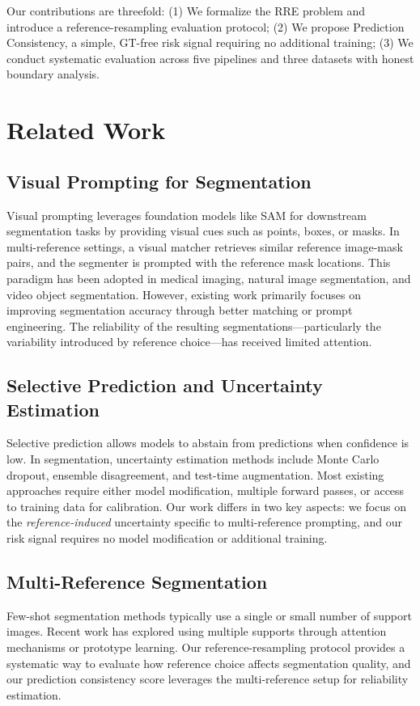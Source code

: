 \documentclass[11pt]{article}
\newcommand{\RRE}{RRE}
\begin{document}
Our contributions are threefold: (1) We formalize the \RRE{} problem and introduce a 
reference-resampling evaluation protocol; (2) We propose Prediction Consistency, a simple, 
GT-free risk signal requiring no additional training; (3) We conduct systematic evaluation 
across five pipelines and three datasets with honest boundary analysis.

\section{Related Work}

\subsection{Visual Prompting for Segmentation}
Visual prompting leverages foundation models like SAM for downstream segmentation tasks 
by providing visual cues such as points, boxes, or masks. In multi-reference settings, 
a visual matcher retrieves similar reference image-mask pairs, and the segmenter is 
prompted with the reference mask locations. This paradigm has been adopted in medical 
imaging, natural image segmentation, and video object segmentation. However, existing 
work primarily focuses on improving segmentation accuracy through better matching or 
prompt engineering. The reliability of the resulting segmentations---particularly the 
variability introduced by reference choice---has received limited attention.

\subsection{Selective Prediction and Uncertainty Estimation}
Selective prediction allows models to abstain from predictions when confidence is low. 
In segmentation, uncertainty estimation methods include Monte Carlo dropout, ensemble 
disagreement, and test-time augmentation. Most existing approaches require either model 
modification, multiple forward passes, or access to training data for calibration. Our 
work differs in two key aspects: we focus on the \textit{reference-induced} uncertainty 
specific to multi-reference prompting, and our risk signal requires no model modification 
or additional training.

\subsection{Multi-Reference Segmentation}
Few-shot segmentation methods typically use a single or small number of support images. 
Recent work has explored using multiple supports through attention mechanisms or prototype 
learning. Our reference-resampling protocol provides a systematic way to evaluate how 
reference choice affects segmentation quality, and our prediction consistency score 
leverages the multi-reference setup for reliability estimation.
\end{document}
